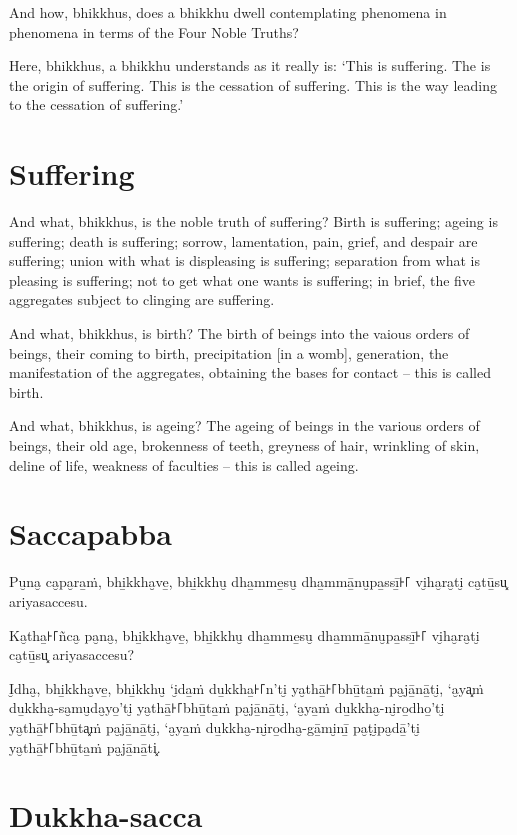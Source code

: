 And how, bhikkhus, does a bhikkhu dwell contemplating phenomena in phenomena in
terms of the Four Noble Truths?

Here, bhikkhus, a bhikkhu understands as it really is: `This is suffering. The
is the origin of suffering. This is the cessation of suffering. This is the way
leading to the cessation of suffering.'

\section{Suffering}

And what, bhikkhus, is the noble truth of suffering? Birth is suffering; ageing
is suffering; death is suffering; sorrow, lamentation, pain, grief, and despair
are suffering; union with what is displeasing is suffering; separation from what
is pleasing is suffering; not to get what one wants is suffering; in brief, the
five aggregates subject to clinging are suffering.

And what, bhikkhus, is birth? The birth of beings into the vaious orders of
beings, their coming to birth, precipitation [in a womb], generation, the
manifestation of the aggregates, obtaining the bases for contact -- this is
called birth.

And what, bhikkhus, is ageing? The ageing of beings in the various orders of
beings, their old age, brokenness of teeth, greyness of hair, wrinkling of skin,
deline of life, weakness of faculties -- this is called ageing.

\paliPage

\section*{Saccapabba}

Pu̮na̮ ca̮pa̮ra̱ṁ, bhi̱kkha̮ve̱, bhi̱kkhu̮ dha̱mme̱su̮ dha̱mmā̱nu̮pa̱ssī̱꜔꜒ vi̮ha̮ra̮ti̮ ca̮tū̱su͓
ariyasaccesu.

Ka̮tha̱꜔꜒ñca̮ pa̮na̮, bhi̱kkha̮ve̱, bhi̱kkhu̮ dha̱mme̱su̮ dha̱mmā̱nu̮pa̱ssī̱꜔꜒ vi̮ha̮ra̮ti̮ ca̮tū̱su͓
ariyasaccesu?

I̮dha̮, bhi̱kkha̮ve̱, bhi̱kkhu̮ ‘i̮da̱ṁ du̱kkha̱꜔꜒n’ti̮ ya̮thā̱꜔꜒bhū̱ta̱ṁ pa̮jā̱nā̱ti̮, ‘a̮ya͓ṁ
du̱kkha̮-sa̮mu̮da̮yo̱’ti̮ ya̮thā̱꜔꜒bhū̱ta̱ṁ pa̮jā̱nā̱ti̮, ‘a̮ya̱ṁ du̱kkha̮-ni̮ro̱dho̱’ti̮ ya̮thā̱꜔꜒bhū̱ta͓ṁ
pa̮jā̱nā̱ti̮, ‘a̮ya̱ṁ du̱kkha̮-ni̮ro̱dha̮-gā̱mi̮nī̱ pa̮ṭi̮pa̮dā̱’ti̮ ya̮thā̱꜔꜒bhū̱ta̱ṁ pa̮jā̱nā̱ti͓.

\section*{Dukkha-sacca}

